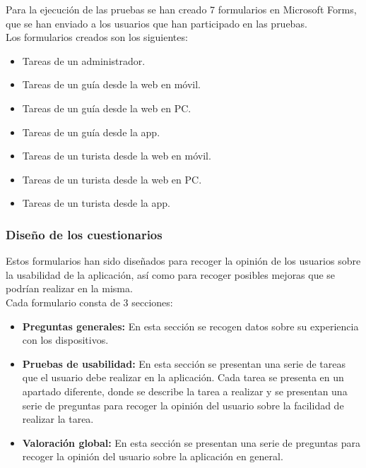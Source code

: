Para la ejecución de las pruebas se han creado 7 formularios en Microsoft Forms, que se han enviado a los usuarios que han participado en las pruebas.
\\[1ex]
Los formularios creados son los siguientes:
\begin{itemize}
	\item Tareas de un administrador.
	\item Tareas de un guía desde la web en móvil.
	\item Tareas de un guía	desde la web en PC.
	\item Tareas de un guía desde la app.
	\item Tareas de un turista desde la web en móvil.
	\item Tareas de un turista desde la web en PC.
	\item Tareas de un turista desde la app.
\end{itemize}

\subsubsection{Diseño de los cuestionarios}
Estos formularios han sido diseñados para recoger la opinión de los usuarios sobre la usabilidad de la aplicación, así como para recoger posibles mejoras que se podrían realizar en la misma.\\
Cada formulario consta de 3 secciones:
\begin{itemize}
	\item \textbf{Preguntas generales:} En esta sección se recogen datos sobre su experiencia con los dispositivos.
	\item \textbf{Pruebas de usabilidad:} En esta sección se presentan una serie de tareas que el usuario debe realizar en la aplicación. Cada tarea se presenta en un apartado diferente, donde se describe la tarea a realizar y se presentan una serie de preguntas para recoger la opinión del usuario sobre la facilidad de realizar la tarea.
	\item \textbf{Valoración global:} En esta sección se presentan una serie de preguntas para recoger la opinión del usuario sobre la aplicación en general.
\end{itemize}


